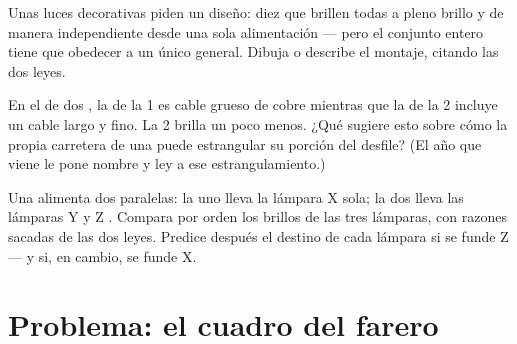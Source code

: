 \begin{exercise}[$\star\star$]\label{exo:g7:circuits-series-parallel:10}
Unas luces decorativas piden un diseño: diez  que
brillen todas a pleno brillo y de manera independiente desde una sola
alimentación --- pero el conjunto entero tiene que obedecer a un único
 general. Dibuja o describe el montaje, citando las
dos leyes.
\end{exercise}

\begin{exercise}[$\star\star$]\label{exo:g7:circuits-series-parallel:11}
En el  de dos , la  de
la  1 es cable grueso de cobre mientras que la  de
la  2 incluye un cable largo y fino. La  2
brilla un poco menos. ¿Qué sugiere esto sobre cómo la propia carretera
de una  puede estrangular su porción del desfile? (El año que
viene le pone nombre y ley a ese estrangulamiento.)
\end{exercise}

\begin{exercise}[$\star\star\star$]\label{exo:g7:circuits-series-parallel:12}
Una  alimenta dos  paralelas: la  uno
lleva la lámpara X sola; la  dos lleva las lámparas Y y Z
. Compara por orden los brillos de las tres lámparas, con
razones sacadas de las dos leyes. Predice después el destino de cada
lámpara si se funde Z --- y si, en cambio, se funde X.
\end{exercise}

\section{Problema: el cuadro del farero}

